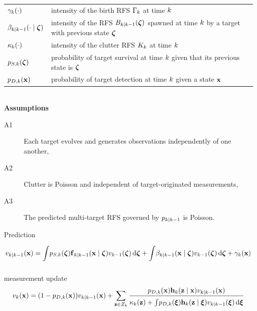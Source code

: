 \documentclass[a4paper,10pt]{scrreprt}
\theoremstyle{theorem}
\theoremstyle{definition}
\begin{document}
\begin{table}[h]
\centering
\begin{tabular}{@{} l l @{}}
	\toprule
	\( \gamma_k(\cdot) \)								& intensity of the birth RFS \( \Gamma_k \) at time \( k \) \\
	\( \beta_{\tind|\tind-1}(\cdot \mid \vb{\zeta}) \) 		& intensity of the RFS \( B_{\tind|\tind-1}(\vb{\zeta}) \) spawned at time \( k \) by a target with previous state \( \vb{\zeta} \) \\
	\( \kappa_k(\cdot) \)								& intensity of the clutter RFS \( K_k \) at time \( k \) \\
	\( p_{S,k}(\vb{\zeta}) \)								& probability of target survival at time \( k \) given that its previous state is \( \vb{\zeta} \) \\
	\( p_{D,k}(\inVar) \)									& probability of target detection at time \( k \) given a state \( \inVar \) \\
	\bottomrule
\end{tabular}
\end{table}

\ \\
\textbf{Assumptions}\\
\begin{description}
	\item[A1] Each target evolves and generates observations independently of one another,
	\item[A2] Clutter is Poisson and independent of target-originated measurements,
	\item[A3] The predicted multi-target RFS governed by \( p_{k|k-1} \) is Poisson.
\end{description}


Prediction
\begin{equation}\label{eq:phd_filter_prediction}
	v_{\tind|\tind-1}(\inVar) 
	= \integ p_{S,\tind}(\vb{\zeta}) \stFcn_{\tind|\tind-1}(\inVar \mid \vb{\zeta}) v_{\tind-1}(\vb{\zeta}) \dx[\vb{\zeta}]
	+ \integ \beta_{\tind|\tind-1}(\inVar \mid \vb{\zeta}) v_{\tind-1}(\vb{\zeta}) \dx[\vb{\zeta}] + \gamma_\tind(\inVar)
\end{equation}

measurement update
\begin{equation}\label{eq:phd_filter_update}
	v_\tind(\inVar) = (1 - p_{D,\tind}(\inVar))v_{\tind|\tind-1}(\inVar) + \sum\limits_{\msVar \in \msSet_\tind} \frac{p_{D,\tind}(\inVar)\msFcn_\tind(\msVar \mid \inVar) v_{\tind|\tind-1}(\inVar)}{\kappa_\tind(\msVar) + \integ p_{D,\tind}(\inVarU) \msFcn_\tind(\msVar\mid\inVarU) v_{\tind|\tind-1}(\inVarU) \dx[\inVarU]} 
\end{equation}
\end{document}
